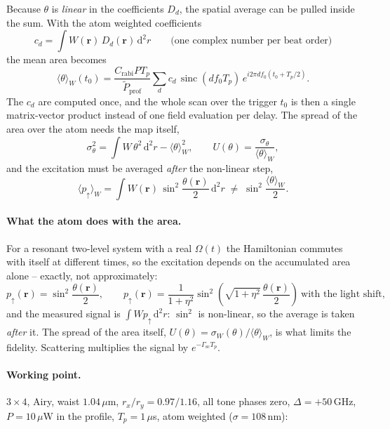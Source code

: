 Because $\theta$ is \emph{linear} in the coefficients $D_d$, the spatial average
can be pulled inside the sum. With the atom weighted coefficients
\begin{equation}
c_d=\int\! W(\mathbf r)\,D_d(\mathbf r)\,\mathrm d^2r
\qquad\text{(one complex number per beat order)}
\end{equation}
the mean area becomes
\begin{equation}
\langle\theta\rangle_W(t_0)
=\frac{C_\mathrm{rabi}PT_p}{\tilde P_\mathrm{prof}}
\sum_d c_d\,\operatorname{sinc}(df_0T_p)\,e^{i2\pi df_0(t_0+T_p/2)} .
\end{equation}
The $c_d$ are computed once, and the whole scan over the trigger $t_0$ is then a
single matrix-vector product instead of one field evaluation per delay. The
spread of the area over the atom needs the map itself,
\begin{equation}
\sigma_\theta^2=\int\! W\,\theta^2\,\mathrm d^2r-\langle\theta\rangle_W^2 ,
\qquad
U(\theta)=\frac{\sigma_\theta}{\langle\theta\rangle_W} ,
\end{equation}
and the excitation must be averaged \emph{after} the non-linear step,
\begin{equation}
\langle p_\uparrow\rangle_W=\int\! W(\mathbf r)\,
\sin^2\!\frac{\theta(\mathbf r)}{2}\,\mathrm d^2r
\;\neq\;\sin^2\!\frac{\langle\theta\rangle_W}{2} .
\end{equation}

\paragraph{What the atom does with the area.}
For a resonant two-level system with a real $\Omega(t)$ the Hamiltonian
commutes with itself at different times, so the excitation depends on the
accumulated area alone -- exactly, not approximately:
\begin{equation}
p_\uparrow(\mathbf r)=\sin^2\frac{\theta(\mathbf r)}{2},
\qquad
p_\uparrow(\mathbf r)=\frac{1}{1+\eta^2}
\sin^2\!\left(\sqrt{1+\eta^2}\,\frac{\theta(\mathbf r)}{2}\right)
\ \text{with the light shift},
\end{equation}
and the measured signal is $\int W p_\uparrow\,\mathrm d^2r$: $\sin^2$ is
non-linear, so the average is taken \emph{after} it. The spread of the area
itself, $U(\theta)=\sigma_W(\theta)/\langle\theta\rangle_W$, is what limits the
fidelity. Scattering multiplies the signal by $e^{-\Gamma_\mathrm{sc}T_p}$.

\paragraph{Working point.}
$3\times4$, Airy, waist $1.04\,\mu$m, $r_x/r_y=0.97/1.16$, all tone phases
zero, $\Delta=+50$\,GHz, $P=10\,\mu$W in the profile, $T_p=1\,\mu$s, atom
weighted ($\sigma=108$\,nm):


